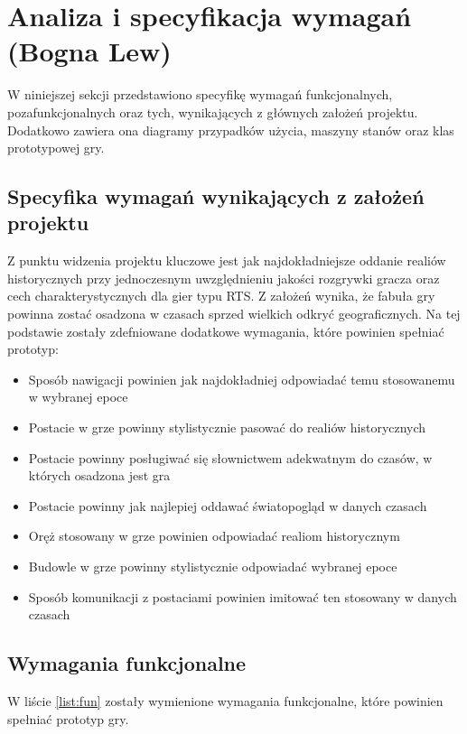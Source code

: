 \section{Analiza i specyfikacja wymagań (Bogna Lew)}
W niniejszej sekcji przedstawiono specyfikę wymagań funkcjonalnych, pozafunkcjonalnych oraz tych, wynikających z
głównych założeń projektu. Dodatkowo zawiera ona diagramy przypadków użycia, maszyny stanów oraz klas prototypowej gry.

\subsection{Specyfika wymagań wynikających z założeń projektu}
Z punktu widzenia projektu kluczowe jest jak najdokładniejsze oddanie realiów historycznych przy jednoczesnym
uwzględnieniu jakości rozgrywki gracza oraz cech charakterystycznych dla gier typu RTS. Z założeń wynika, że fabuła
gry powinna zostać osadzona w czasach sprzed wielkich odkryć geograficznych. Na tej podstawie zostały zdefniowane
dodatkowe wymagania, które powinien spełniać prototyp:
\begin{itemize}
  \item Sposób nawigacji powinien jak najdokładniej odpowiadać temu stosowanemu w wybranej epoce
  \item Postacie w grze powinny stylistycznie pasować do realiów historycznych
  \item Postacie powinny posługiwać się słownictwem adekwatnym do czasów, w których osadzona jest gra
  \item Postacie powinny jak najlepiej oddawać światopogląd w danych czasach
  \item Oręż stosowany w grze powinien odpowiadać realiom historycznym
  \item Budowle w grze powinny stylistycznie odpowiadać wybranej epoce
  \item Sposób komunikacji z postaciami powinien imitować ten stosowany w danych czasach
\end{itemize}

\subsection{Wymagania funkcjonalne}\label{ss:fun}
W liście \ref{list:fun} zostały wymienione wymagania funkcjonalne, które powinien spełniać prototyp gry.

